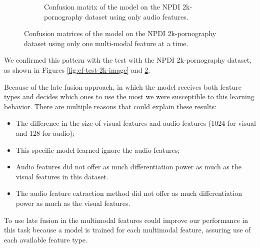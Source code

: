 \begin{figure}[!ht]
\begin{subfigure}[b]{0.49\textwidth}
        \caption{Confusion matrix of the model on the NPDI 2k-pornography dataset using only audio features.}
        \label{fig:cf-test-2k-audio}
    \end{subfigure}
    \caption{Confusion matrices of the model on the NPDI 2k-pornography dataset using only one multi-modal feature at a time.}
\end{figure}

We confirmed this pattern with the test with the NPDI 2k-pornography dataset, as shown in Figures \ref{fig:cf-test-2k-image} and \ref{fig:cf-test-2k-audio}.%

Because of the late fusion approach, in which the model receives both feature types and decides which ones to use the most we were susceptible to this learning behavior.
There are multiple reasons that could explain these results:
\begin{itemize}
    \item The difference in the size of visual features and audio features (1024 for visual and 128 for audio);
    \item This specific model learned ignore the audio features;
    \item Audio features did not offer as much differentiation power as much as the visual features in this dataset.
    \item The audio feature extraction method did not offer as much differentiation power as much as the visual features.
\end{itemize}

To use late fusion in the multimodal features could improve our performance in this task because a model is trained for each multimodal feature, assuring use of each available feature type.

